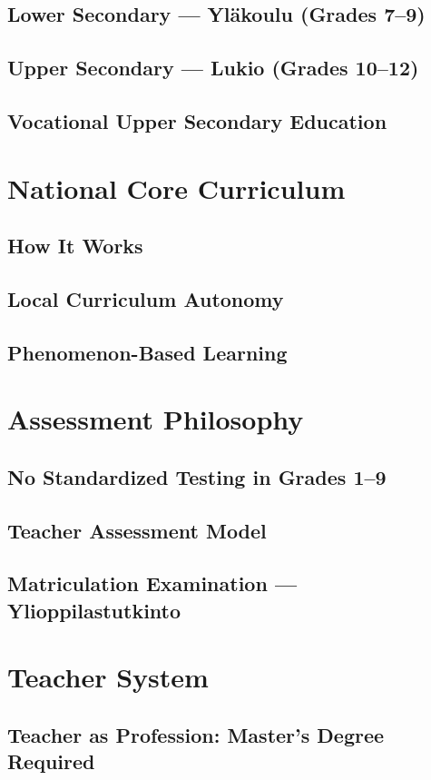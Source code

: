 \subsection{Lower Secondary --- Yläkoulu (Grades 7--9)}
\subsection{Upper Secondary --- Lukio (Grades 10--12)}
\subsection{Vocational Upper Secondary Education}

\section{National Core Curriculum}
\subsection{How It Works}
\subsection{Local Curriculum Autonomy}
\subsection{Phenomenon-Based Learning}

\section{Assessment Philosophy}
\subsection{No Standardized Testing in Grades 1--9}
\subsection{Teacher Assessment Model}
\subsection{Matriculation Examination --- Ylioppilastutkinto}

\section{Teacher System}
\subsection{Teacher as Profession: Master's Degree Required}
